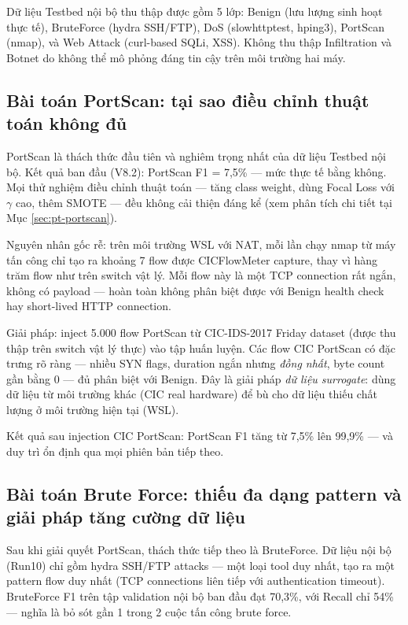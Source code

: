 \documentclass[../DoAn.tex]{subfiles}
\begin{document}
Dữ liệu Testbed nội bộ thu thập được gồm 5 lớp: Benign (lưu lượng sinh hoạt thực tế), BruteForce (hydra SSH/FTP), DoS (slowhttptest, hping3), PortScan (nmap), và Web Attack (curl-based SQLi, XSS). Không thu thập Infiltration và Botnet do không thể mô phỏng đáng tin cậy trên môi trường hai máy.

\subsection{Bài toán PortScan: tại sao điều chỉnh thuật toán không đủ}
\label{subsec:gd4-portscan}

PortScan là thách thức đầu tiên và nghiêm trọng nhất của dữ liệu Testbed nội bộ. Kết quả ban đầu (V8.2): PortScan F1 = 7,5\% --- mức thực tế bằng không. Mọi thử nghiệm điều chỉnh thuật toán --- tăng class weight, dùng Focal Loss với $\gamma$ cao, thêm SMOTE --- đều không cải thiện đáng kể (xem phân tích chi tiết tại Mục \ref{sec:pt-portscan}).

Nguyên nhân gốc rễ: trên môi trường WSL với NAT, mỗi lần chạy nmap từ máy tấn công chỉ tạo ra khoảng 7 flow được CICFlowMeter capture, thay vì hàng trăm flow như trên switch vật lý. Mỗi flow này là một TCP connection rất ngắn, không có payload --- hoàn toàn không phân biệt được với Benign health check hay short-lived HTTP connection.

Giải pháp: inject 5.000 flow PortScan từ CIC-IDS-2017 Friday dataset (được thu thập trên switch vật lý thực) vào tập huấn luyện. Các flow CIC PortScan có đặc trưng rõ ràng --- nhiều SYN flags, duration ngắn nhưng \textit{đồng nhất}, byte count gần bằng 0 --- đủ phân biệt với Benign. Đây là giải pháp \textit{dữ liệu surrogate}: dùng dữ liệu từ môi trường khác (CIC real hardware) để bù cho dữ liệu thiếu chất lượng ở môi trường hiện tại (WSL).

Kết quả sau injection CIC PortScan: PortScan F1 tăng từ 7,5\% lên 99,9\% --- và duy trì ổn định qua mọi phiên bản tiếp theo.

\subsection{Bài toán Brute Force: thiếu đa dạng pattern và giải pháp tăng cường dữ liệu}
\label{subsec:gd4-bruteforce}

Sau khi giải quyết PortScan, thách thức tiếp theo là BruteForce. Dữ liệu nội bộ (Run10) chỉ gồm hydra SSH/FTP attacks --- một loại tool duy nhất, tạo ra một pattern flow duy nhất (TCP connections liên tiếp với authentication timeout). BruteForce F1 trên tập validation nội bộ ban đầu đạt 70,3\%, với Recall chỉ 54\% --- nghĩa là bỏ sót gần 1 trong 2 cuộc tấn công brute force.
\end{document}
